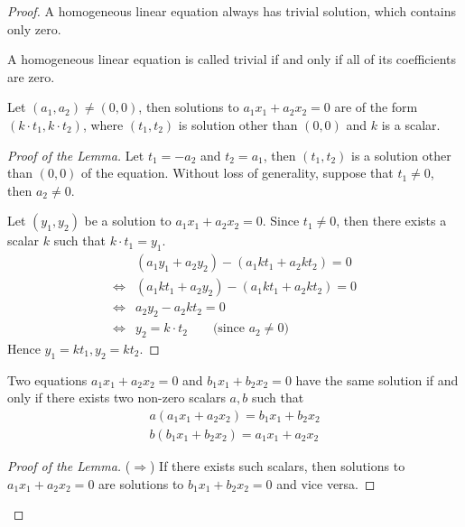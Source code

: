 \begin{proof}
    A homogeneous linear equation always has trivial solution, which contains only zero.

    A homogeneous linear equation is called trivial if and only if all of its coefficients are zero.

    \begin{lemma}\label{lemma:exercise:solution-to-homogeneous-linear-equation}
        Let $(a_{1}, a_{2})\ne (0, 0)$, then solutions to $a_{1}x_{1} + a_{2}x_{2} = 0$ are of the form $(k\cdot t_{1}, k\cdot t_{2})$, where $(t_{1}, t_{2})$ is solution other than $(0, 0)$ and $k$ is a scalar.
    \end{lemma}
    \begin{proof}[Proof of the Lemma]
        Let $t_{1} = -a_{2}$ and $t_{2} = a_{1}$, then $(t_{1}, t_{2})$ is a solution other than $(0, 0)$ of the equation. Without loss of generality, suppose that $t_{1}\ne 0$, then $a_{2}\ne 0$.

        Let $(y_{1}, y_{2})$ be a solution to $a_{1}x_{1} + a_{2}x_{2} = 0$. Since $t_{1}\ne 0$, then there exists a scalar $k$ such that $k\cdot t_{1} = y_{1}$.
        \begin{align*}
                            & (a_{1}y_{1} + a_{2}y_{2}) - (a_{1}kt_{1} + a_{2}kt_{2}) = 0  \\
            \Leftrightarrow & (a_{1}kt_{1} + a_{2}y_{2}) - (a_{1}kt_{1} + a_{2}kt_{2}) = 0 \\
            \Leftrightarrow & a_{2}y_{2} - a_{2}kt_{2} = 0                                 \\
            \Leftrightarrow & y_{2} = k\cdot t_{2} \qquad\text{(since $a_{2}\ne 0$)}
        \end{align*}
        Hence $y_{1} = kt_{1}, y_{2} = kt_{2}$.
    \end{proof}

    \begin{lemma}\label{lemma:exercise:equivalent-homogeneous-linear-equations}
        Two equations $a_{1}x_{1} + a_{2}x_{2} = 0$ and $b_{1}x_{1} + b_{2}x_{2} = 0$ have the same solution if and only if there exists two non-zero scalars $a, b$ such that
        \[
            \begin{split}
                a(a_{1}x_{1} + a_{2}x_{2}) = b_{1}x_{1} + b_{2}x_{2} \\
                b(b_{1}x_{1} + b_{2}x_{2}) = a_{1}x_{1} + a_{2}x_{2}
            \end{split}
        \]
    \end{lemma}
    \begin{proof}[Proof of the Lemma]
        ($\Rightarrow$) If there exists such scalars, then solutions to $a_{1}x_{1} + a_{2}x_{2} = 0$ are solutions to $b_{1}x_{1} + b_{2}x_{2} = 0$ and vice versa.


\end{proof}
\end{proof}
